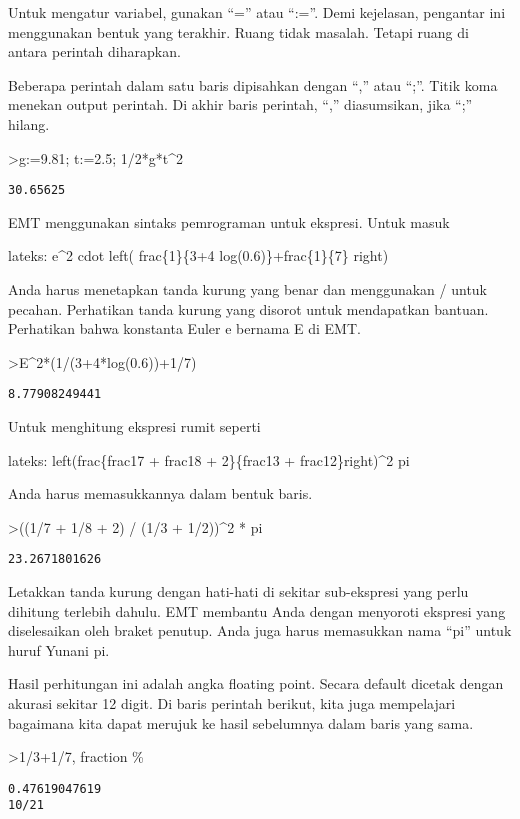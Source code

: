 \documentclass[
]{book}
\begin{document}
Untuk mengatur variabel, gunakan ``='' atau ``:=''. Demi kejelasan, pengantar ini menggunakan bentuk yang terakhir. Ruang tidak masalah. Tetapi ruang di antara perintah diharapkan.

Beberapa perintah dalam satu baris dipisahkan dengan ``,'' atau ``;''. Titik koma menekan output perintah. Di akhir baris perintah, ``,'' diasumsikan, jika ``;'' hilang.

\textgreater g:=9.81; t:=2.5; 1/2*g*t\^{}2

\begin{verbatim}
30.65625
\end{verbatim}

EMT menggunakan sintaks pemrograman untuk ekspresi. Untuk masuk

lateks: e\^{}2 cdot left( frac\{1\}\{3+4 log(0.6)\}+frac\{1\}\{7\} right)

Anda harus menetapkan tanda kurung yang benar dan menggunakan / untuk pecahan. Perhatikan tanda kurung yang disorot untuk mendapatkan bantuan. Perhatikan bahwa konstanta Euler e bernama E di EMT.

\textgreater E\^{}2*(1/(3+4*log(0.6))+1/7)

\begin{verbatim}
8.77908249441
\end{verbatim}

Untuk menghitung ekspresi rumit seperti

lateks: left(frac\{frac17 + frac18 + 2\}\{frac13 + frac12\}right)\^{}2 pi

Anda harus memasukkannya dalam bentuk baris.

\textgreater((1/7 + 1/8 + 2) / (1/3 + 1/2))\^{}2 * pi

\begin{verbatim}
23.2671801626
\end{verbatim}

Letakkan tanda kurung dengan hati-hati di sekitar sub-ekspresi yang perlu dihitung terlebih dahulu. EMT membantu Anda dengan menyoroti ekspresi yang diselesaikan oleh braket penutup. Anda juga harus memasukkan nama ``pi'' untuk huruf Yunani pi.

Hasil perhitungan ini adalah angka floating point. Secara default dicetak dengan akurasi sekitar 12 digit. Di baris perintah berikut, kita juga mempelajari bagaimana kita dapat merujuk ke hasil sebelumnya dalam baris yang sama.

\textgreater1/3+1/7, fraction \%

\begin{verbatim}
0.47619047619
10/21
\end{verbatim}
\end{document}

